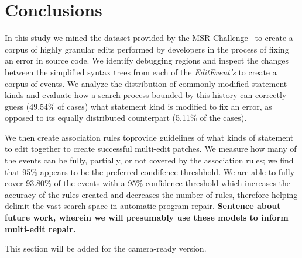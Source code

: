 \documentclass[sigconf]{acmart}
\newcommand{\todo}[1]
  {{\scriptsize \textbf{\color{red} {#1}}}}
\begin{document}
\section{Conclusions}
\label{conclusions}

In this study we mined the dataset provided by the MSR Challenge~\cite{msr18challenge}
to create a corpus of highly granular edits performed by developers in the process
of fixing an error in source code. We identify debugging
regions and inspect the changes between the simplified 
syntax trees from each
of the \textit{EditEvent's} to create a corpus of 
events.
We analyze the distribution of commonly modified statement kinds and evaluate
how a search process bounded by this history can correctly guess (49.54\% of 
cases) what statement kind is modified to fix an error, as opposed to its
equally distributed counterpart (5.11\% of the cases).

We then create association rules toprovide guidelines of what kinds of
statement to edit together to create successful multi-edit patches. 
We measure how many of the events
can be fully, partially, or not covered by the association rules; we find that
95\% appears to be the preferred condifence threshhold.
We are able to fully cover 93.80\% of the events with a 95\% confidence threshold
which increases the accuracy of the rules created and decreases the 
number of rules, therefore helping delimit the vast search space 
in automatic program repair.\todo{Sentence about future work, wherein we will
  presumably use these models to inform multi-edit repair.}




\begin{acks}
 This section will be added for the camera-ready version.

\end{acks}




\end{document}
